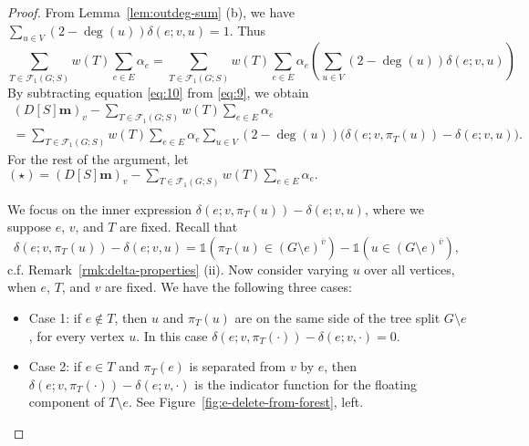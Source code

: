 \documentclass[12pt]{amsart}
\theoremstyle{definition}
\newcommand{\one}{\mathds{1}}
\newcommand{\boldm}{\mathbf{m}}
\newcommand{\trees}{\mathcal{F}_1}
\begin{document}
\begin{proof}
From Lemma~\ref{lem:outdeg-sum} (b), 
we have
$\displaystyle
	\sum_{u \in V} (2 - \deg(u)) \delta(e; v,u)
	= 1. 
$
Thus
\begin{equation}
\label{eq:10}
	\sum_{T \in \trees(G;S)} w({T}) \sum_{e \in E} \alpha_e
	= \sum_{T \in \trees(G;S)} w({T}) \sum_{e \in E} \alpha_e \left( \sum_{u \in V} (2 - \deg(u)) \delta(e; v,u) \right) 
\end{equation}
By subtracting equation \eqref{eq:10} from \eqref{eq:9}, we obtain
\begin{multline}\label{eq:subtract-delta-diff}
	(D[S] \boldm)_v - \sum_{T \in \trees(G;S)} w({T}) \sum_{e \in E} \alpha_e \\
	= \sum_{T \in \trees(G;S)} w({T}) \sum_{e \in E} \alpha_e \sum_{u \in V} (2 - \deg(u)) \Big(\delta(e; v, \pi_T(u)) - \delta(e; v, u) \Big).
\end{multline}
For the rest of the argument, let
$\displaystyle
	(\star) = (D[S] \boldm)_v - \sum_{T \in \trees(G;S)} w({T}) \sum_{e \in E} \alpha_e.
$


We focus on the inner expression $\delta(e; v, \pi_T(u)) - \delta(e; v, u)$,
where we suppose $e$, $v$, and $T$ are fixed.
Recall that
\begin{equation}
\label{eq:delta-diff}
	\delta(e; v, \pi_T(u)) - \delta(e; v, u) 
	= \one(\pi_T(u) \in (G \setminus e)^{\overline v}) - \one( u \in (G \setminus e)^{\overline v}) ,
\end{equation}
c.f. Remark~\ref{rmk:delta-properties} (ii).
Now consider varying $u$ over all vertices, when $e$, $T$, and $v$ are fixed.
We have the following three cases:

\begin{itemize}[leftmargin=*]
\item Case 1: if $e \not \in T$, then $u$ and $\pi_T(u)$ are on the same side of the tree split $G \setminus e$, for every vertex $u$.
In this case $\delta(e;v, \pi_T(\cdot)) - \delta(e; v, \cdot) = 0$.

\item Case 2: if $e \in T$ and $\pi_T(e)$ is separated from $v$ by $e$, then $\delta(e;v, \pi_T(\cdot)) - \delta(e; v, \cdot)$ is the indicator function for the floating component of $T \setminus e$. See Figure~\ref{fig:e-delete-from-forest}, left.


\end{itemize}
\end{proof}
\end{document}
